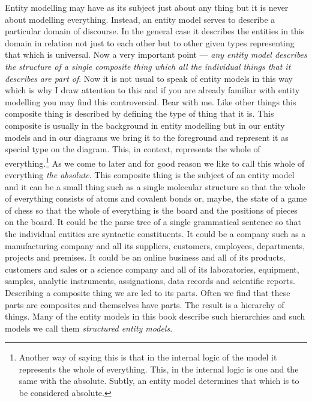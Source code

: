 \mynote Entity modelling may have as its subject just about any thing but it is never about modelling everything.
Instead, an entity model serves to describe a particular domain of discourse. In the general case it describes the entities in this domain in relation not just to each other but to other given types representing that which is universal. 
\mynote
Now a very  important point ---
\textit{any entity model describes the structure of a single composite thing which all the individual things that it describes are part of}. Now it is not usual to speak of entity models in this way which is why I draw attention to this and if you are already familiar with entity modelling you may find this controversial. Bear with me.
\mynote
Like other things this composite thing is described by defining the type of thing that it is. This composite is usually in the background in entity modelling but in our entity models and in our diagrams we bring it to the foreground and represent it as special type on the diagram. 
This, in context, represents the whole of everything.\footnote{Another way of saying this is that in the internal logic of the model it represents the whole of everything. This, in the internal logic is one and the same with the absolute. Subtly, an entity model determines that which is to be considered absolute.} As we come to later and for good reason we like to call this whole of everything \textit{the absolute}.   This composite thing  is the subject of an entity model and it can be a small thing such as a single molecular structure so that the whole of everything consists of atoms and covalent bonds or, maybe, the state of a game of chess so that the whole of everything is the board and the positions of pieces on the board. It could be the parse tree of a single grammatical sentence 
so that the individual entities are syntactic constituents. 
It could be a company such as a manufacturing company and all its suppliers, customers, employees, departments, projects and premises. 
It could be an online business and all of its products, customers and sales or
a science company and all of its laboratories, equipment, samples, analytic instruments, assignations, data records and  scientific reports. 
\mynote
Describing a composite thing we are led to its parts. Often we find that these parts are composites and themselves have parts. The result is a hierarchy of things. Many of the  entity models in this book describe such hierarchies and such models we call them \textit{structured entity models}.

